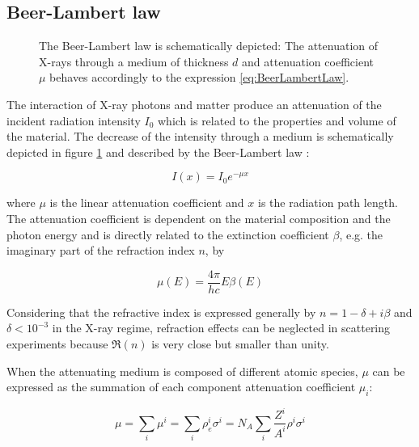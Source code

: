\subsection{Beer-Lambert law}
\label{sec:BeerLambert}

\begin{figure}%
	\centering
	        \def\svgwidth{0.75\linewidth}
		
		\caption{The Beer-Lambert law is schematically depicted: The attenuation of X-rays through a medium of thickness $d$ and attenuation coefficient $\mu$ behaves accordingly to the expression \ref{eq:BeerLambertLaw}.}
		\label{fig:BeerLambertScheme}
\end{figure}

The interaction of X-ray photons and matter produce an attenuation of the incident radiation intensity $I_0$ which is related to the properties and volume of the material. The decrease of the intensity through a medium is schematically depicted in figure \ref{fig:BeerLambertScheme} and described by the Beer-Lambert law \citep{als-nielsen_elements_2011}:

\begin{equation}
        \label{eq:BeerLambertLaw}
        I\left( x \right)=I_0e^{-\mu x}
\end{equation}

where $\mu$ is the linear attenuation coefficient and $x$ is the radiation path length. The attenuation coefficient is dependent on the material composition and the photon energy and is directly related to the extinction coefficient $\beta$, e.g. the imaginary part of the refraction index $n$, by \citep{baumgartel_e.-e._1984-1}

\begin{equation}
        \mu (E) = \frac{4\pi}{hc} E \beta(E)
\end{equation}

Considering that the refractive index is expressed generally by $n = 1 - \delta +i \beta$ and $\delta<10^{-3}$ in the X-ray regime\citep{henke_x-ray_1993}, refraction effects can be neglected in scattering experiments because $\Re(n)$ is very close but smaller than unity.

When the attenuating medium is composed of different atomic species, $\mu$ can be expressed as the summation of each component attenuation coefficient $\mu_i$:

\begin{equation}
        \label{eq:AttenuationMultiComponent}
        \mu = \sum_i \mu^i = \sum_i \rho_e^i \sigma^i  =N_A\sum_i  \frac{Z^i}{A^i} \rho^i \sigma^i
\end{equation}

